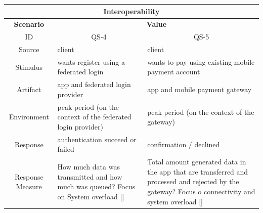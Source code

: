  \begin{table}[H]
    \begin{tabularx}{\textwidth}{|c|X|X|}
        \hline
        \multicolumn{3}{c}{\textbf{Interoperability}} \\
        \hline
        \toprule
        \multicolumn{1}{|c|}{\textbf{Scenario}} & \multicolumn{2}{|c|}{\textbf{Value}} \\
        \midrule
        \multicolumn{1}{|c|}{ID} & \multicolumn{1}{|c|}{QS-4} & \multicolumn{1}{|c|}{QS-5}  \\
        \hline
        Source & \Gls{client} & \Gls{client}  \\
        \hline
        Stimulus & wants register using a \gls{federated login} & wants to pay using existing mobile payment account \\
        \hline
        Artifact & app and \gls{federated login} provider & app and \gls{mobile payment gateway} \\
        \hline
        Environment & peak period (on the context of the \gls{federated login} provider) & peak period (on the context of the gateway) \\
        \hline
        Response & authentication succeed or failed & confirmation / declined \\
        \hline
        Response Measure & How much data was transmitted and how much was queued? Focus on System overload [\cite{refart:MKMS}]
        & Total amount generated data in the app that are transferred and processed and rejected by the gateway? Focus o connectivity 
        and system overload [\cite{refart:MKMS}] \\
        \bottomrule
    \end{tabularx}
\end{table}

